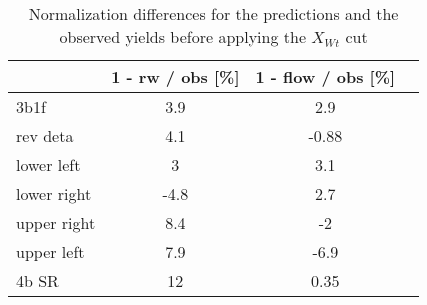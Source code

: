 \begin{table}
\centering
\caption{Normalization differences for the predictions and the observed yields before applying the $X_{Wt}$ cut}
\label{tab:ks}
\begin{tabular}{lccc}
\toprule
{} &  1 - rw / obs [\%] &  1 - flow / obs [\%] \\
\midrule
3b1f        &                3.9 &                  2.9 \\
rev deta    &                4.1 &                -0.88 \\
lower left  &                  3 &                  3.1 \\
lower right &               -4.8 &                  2.7 \\
upper right &                8.4 &                   -2 \\
upper left  &                7.9 &                 -6.9 \\
4b SR       &                 12 &                 0.35 \\
\bottomrule
\end{tabular}
\end{table}
